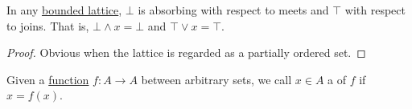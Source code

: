 \begin{proposition}\label{thm:bounded_lattice_absorbing}
  In any \hyperref[def:semilattice/bounded]{bounded lattice}, \( \bot \) is absorbing with respect to meets and \( \top \) with respect to joins. That is, \( \bot \wedge x = \bot \) and \( \top \vee x = \top \).
\end{proposition}
\begin{proof}
  Obvious when the lattice is regarded as a partially ordered set.
\end{proof}

\begin{definition}\label{def:fixed_point}
  Given a \hyperref[def:function]{function} \( f: A \to A \) between arbitrary sets, we call \( x \in A \) a  of \( f \) if \( x = f(x) \).
\end{definition}

